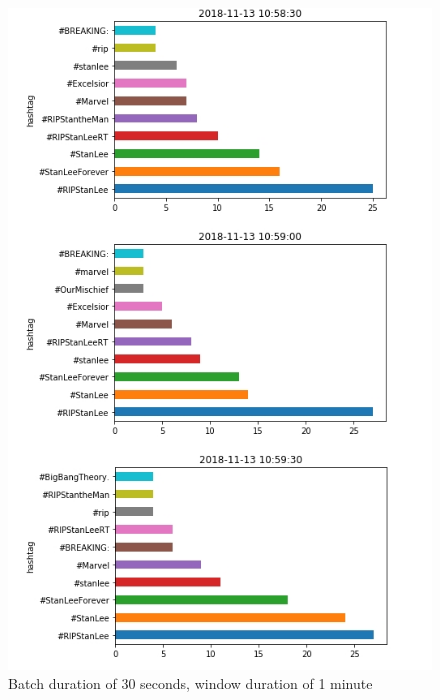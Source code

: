 \documentclass[12pt,a4paper]{article}
\begin{document}
\begin{figure}[h]
    \centering
    \includegraphics[width=12cm]{output2-1min.jpg}
    \caption{Batch duration of 30 seconds, window duration of 1 minute}
    \label{fig:my_label}
\end{figure}
\end{document}
